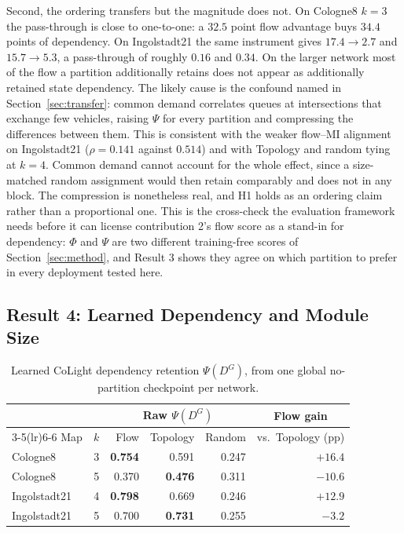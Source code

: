\documentclass[journal]{IEEEtran}
\theoremstyle{definition}
\begin{document}
Second, the ordering transfers but the magnitude does not.
On Cologne8 $k=3$ the pass-through is close to one-to-one: a $32.5$ point
flow advantage buys $34.4$ points of dependency.
On Ingolstadt21 the same instrument gives $17.4 \to 2.7$ and $15.7 \to 5.3$,
a pass-through of roughly $0.16$ and $0.34$.
On the larger network most of the flow a partition additionally retains does
not appear as additionally retained state dependency.
The likely cause is the confound named in Section~\ref{sec:transfer}: common
demand correlates queues at intersections that exchange few vehicles, raising
$\Psi$ for every partition and compressing the differences between them.
This is consistent with the weaker flow--MI alignment on Ingolstadt21
($\rho=0.141$ against $0.514$) and with Topology and random tying at $k=4$.
Common demand cannot account for the whole effect, since a size-matched
random assignment would then retain comparably and does not in any block.
The compression is nonetheless real, and H1 holds as an ordering claim rather
than a proportional one.
This is the cross-check the evaluation framework needs before it can license
contribution 2's flow score as a stand-in for dependency: $\Phi$ and $\Psi$
are two different training-free scores of Section~\ref{sec:method}, and
Result 3 shows they agree on which partition to prefer in every deployment
tested here.

\subsection{Result 4: Learned Dependency and Module Size}
\label{sec:exp-dg}

\begin{table}[t]
    \centering
    \caption{Learned CoLight dependency retention $\Psi(D^G)$, from one
        global no-partition checkpoint per network.}
    \label{tab:psi-dg}
    \footnotesize
    \begin{tabular}{lrrrrr}
        \toprule
                     &     & \multicolumn{3}{c}{Raw $\Psi(D^G)$} & \multicolumn{1}{c}{Flow gain}                               \\
        \cmidrule(lr){3-5}\cmidrule(lr){6-6}
        Map          & $k$ & Flow                                & Topology                      & Random & vs.\ Topology (pp) \\
        \midrule
        Cologne8     & 3   & \textbf{0.754}                      & 0.591                         & 0.247  & $+16.4$            \\
        Cologne8     & 5   & 0.370                               & \textbf{0.476}                & 0.311  & $-10.6$            \\
        Ingolstadt21 & 4   & \textbf{0.798}                      & 0.669                         & 0.246  & $+12.9$            \\
        Ingolstadt21 & 5   & 0.700                               & \textbf{0.731}                & 0.255  & $-3.2$             \\
        \bottomrule
    \end{tabular}
\end{table}
\end{document}

